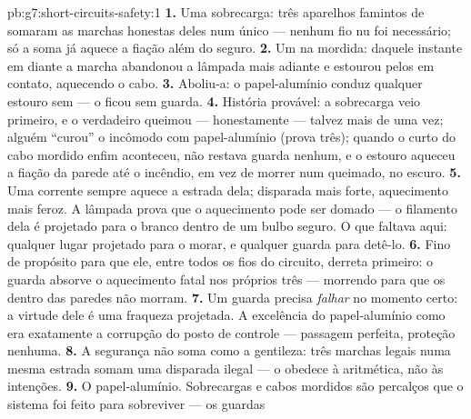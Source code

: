 \begin{solution}{pb:g7:short-circuits-safety:1}
\textbf{1.} Uma sobrecarga: três aparelhos famintos de  somaram
as marchas honestas deles num único  --- nenhum fio nu foi
necessário; só a soma já aquece a fiação além do seguro.
\textbf{2.} Um  na mordida: daquele instante em diante
a marcha abandonou a lâmpada mais adiante e estourou pelos 
em contato, aquecendo o cabo.
\textbf{3.} Aboliu-a: o papel-alumínio conduz qualquer estouro sem
 --- o  ficou sem guarda.
\textbf{4.} História provável: a sobrecarga veio primeiro, e o
 verdadeiro queimou --- honestamente --- talvez mais de uma
vez; alguém ``curou'' o incômodo com papel-alumínio (prova três);
quando o curto do cabo mordido enfim aconteceu, não restava guarda
nenhum, e o estouro aqueceu a fiação da parede até o incêndio, em vez
de morrer num  queimado, no escuro.
\textbf{5.} Uma corrente sempre aquece a estrada dela; disparada mais
forte, aquecimento mais feroz. A lâmpada prova que o aquecimento pode
ser domado --- o filamento dela é projetado para o  branco
dentro de um bulbo seguro. O que faltava aqui: qualquer lugar
projetado para o  morar, e qualquer guarda para detê-lo.
\textbf{6.} Fino de propósito para que ele, entre todos os fios do
circuito, derreta primeiro: o guarda absorve o aquecimento fatal nos
próprios três  --- morrendo para que os  dentro das
paredes não morram.
\textbf{7.} Um guarda precisa \emph{falhar} no momento certo: a
virtude dele é uma fraqueza projetada. A excelência do
papel-alumínio como  era exatamente a corrupção do posto de
controle --- passagem perfeita, proteção nenhuma.
\textbf{8.} A segurança não soma como a gentileza: três marchas
legais numa mesma estrada somam uma disparada ilegal --- o 
obedece à aritmética, não às intenções.
\textbf{9.} O papel-alumínio. Sobrecargas e cabos mordidos são
percalços que o sistema foi feito para sobreviver --- os guardas

\end{solution}
